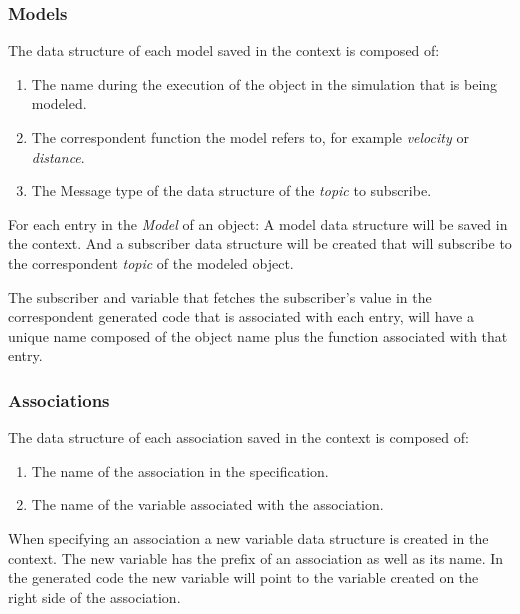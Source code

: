 \subsubsection{Models}
\label{sssec:compileModels}

The data structure of each model saved in the context is composed of:

\begin{enumerate}
    \item The name during the execution of the object in the simulation that is being modeled.
    \item The correspondent function the model refers to, for example \textit{velocity} or \textit{distance}.
    \item The Message type of the data structure of the \textit{topic} to subscribe.
\end{enumerate}

For each entry in the \textit{Model} of an object: A model data structure will be saved in the context. And a subscriber data structure will be created that will subscribe to the correspondent \textit{topic} of the modeled object.

The subscriber and variable that fetches the subscriber’s value in the correspondent generated code that is associated with each entry, will have a unique name composed of the object name plus the function associated with that entry.


\subsubsection{Associations}
\label{sssec:compileAssoc}

The data structure of each association saved in the context is composed of:

\begin{enumerate}
    \item The name of the association in the specification.
    \item The name of the variable associated with the association.
\end{enumerate}

When specifying an association a new variable data structure is created in the context. The new variable has the prefix of an association as well as its name. In the generated code the new variable will point to the variable created on the right side of the association.


